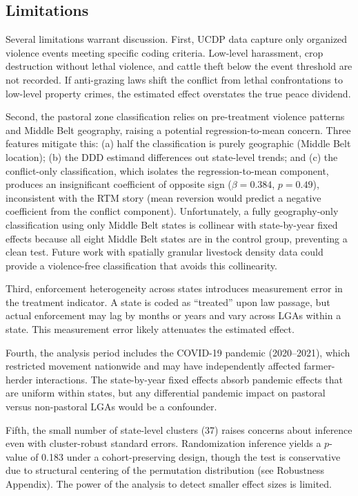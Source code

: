 \documentclass[12pt]{article}
\begin{document}
\subsection{Limitations}

Several limitations warrant discussion. First, UCDP data capture only organized violence events meeting specific coding criteria. Low-level harassment, crop destruction without lethal violence, and cattle theft below the event threshold are not recorded. If anti-grazing laws shift the conflict from lethal confrontations to low-level property crimes, the estimated effect overstates the true peace dividend.

Second, the pastoral zone classification relies on pre-treatment violence patterns and Middle Belt geography, raising a potential regression-to-mean concern. Three features mitigate this: (a) half the classification is purely geographic (Middle Belt location); (b) the DDD estimand differences out state-level trends; and (c) the conflict-only classification, which isolates the regression-to-mean component, produces an insignificant coefficient of opposite sign ($\beta = 0.384$, $p = 0.49$), inconsistent with the RTM story (mean reversion would predict a negative coefficient from the conflict component). Unfortunately, a fully geography-only classification using only Middle Belt states is collinear with state-by-year fixed effects because all eight Middle Belt states are in the control group, preventing a clean test. Future work with spatially granular livestock density data could provide a violence-free classification that avoids this collinearity.

Third, enforcement heterogeneity across states introduces measurement error in the treatment indicator. A state is coded as ``treated'' upon law passage, but actual enforcement may lag by months or years and vary across LGAs within a state. This measurement error likely attenuates the estimated effect.

Fourth, the analysis period includes the COVID-19 pandemic (2020--2021), which restricted movement nationwide and may have independently affected farmer-herder interactions. The state-by-year fixed effects absorb pandemic effects that are uniform within states, but any differential pandemic impact on pastoral versus non-pastoral LGAs would be a confounder.

Fifth, the small number of state-level clusters (37) raises concerns about inference even with cluster-robust standard errors. Randomization inference yields a $p$-value of 0.183 under a cohort-preserving design, though the test is conservative due to structural centering of the permutation distribution (see Robustness Appendix). The power of the analysis to detect smaller effect sizes is limited.
\end{document}
